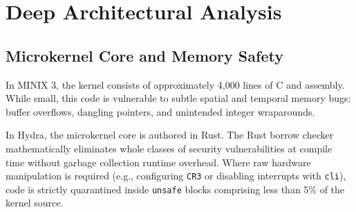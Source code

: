 \section{Deep Architectural Analysis}
\label{sec:comp_deep_analysis}

\subsection{Microkernel Core and Memory Safety}
In MINIX 3, the kernel consists of approximately 4,000 lines of C and assembly. While small, this code is vulnerable to subtle spatial and temporal memory bugs: buffer overflows, dangling pointers, and unintended integer wraparounds.

In Hydra, the microkernel core is authored in Rust. The Rust borrow checker mathematically eliminates whole classes of security vulnerabilities at compile time without garbage collection runtime overhead. Where raw hardware manipulation is required (e.g., configuring \texttt{CR3} or disabling interrupts with \texttt{cli}), code is strictly quarantined inside \texttt{unsafe} blocks comprising less than 5\% of the kernel source.

